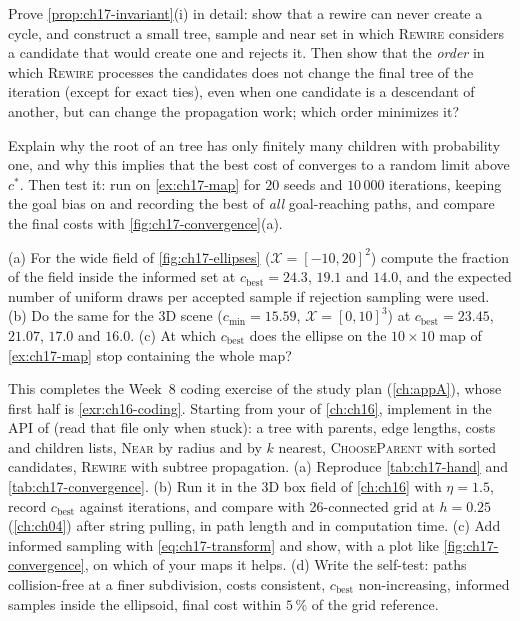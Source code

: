 \begin{exercise}[\difficulty{2}]
\label{exr:ch17-invariant}
Prove \cref{prop:ch17-invariant}(i) in detail: show that a rewire can never
create a cycle, and construct a small tree, sample and near set in which
\textsc{Rewire} considers a candidate that would create one and rejects it.
Then show that the \emph{order} in which \textsc{Rewire} processes the
candidates does not change the final tree of the iteration (except for
exact ties), even when one candidate is a descendant of another, but can
change the propagation work; which order minimizes it?
\end{exercise}

\begin{exercise}[\difficulty{2}]
\label{exr:ch17-rrt-limit}
Explain why the root of an \rrt tree has only finitely many children with
probability one, and why this implies that the best cost of \rrt converges
to a random limit above $c^*$. Then test it: run  on
\cref{ex:ch17-map} for $20$ seeds and $10\,000$ iterations, keeping the goal
bias on and recording the best of \emph{all} goal-reaching paths, and
compare the final costs with \cref{fig:ch17-convergence}(a).
\end{exercise}

\begin{exercise}[\difficulty{2}]
\label{exr:ch17-fraction}
(a) For the wide field of \cref{fig:ch17-ellipses}
($\mathcal{X}=[-10,20]^2$) compute the fraction of
the field inside the informed set at $c_{\mathrm{best}}=24.3$, $19.1$ and
$14.0$, and the expected number of uniform draws per accepted sample if
rejection sampling were used. (b) Do the same for the 3D scene
($c_{\min}=15.59$, $\mathcal{X}=[0,10]^3$) at $c_{\mathrm{best}}=23.45$,
$21.07$, $17.0$ and $16.0$. (c) At which $c_{\mathrm{best}}$ does the
ellipse on the $10\times10$ map of \cref{ex:ch17-map} stop containing the
whole map?
\end{exercise}

\begin{exercise}
\label{exr:ch17-coding}
This completes the Week~8 coding exercise of the study plan
(\cref{ch:appA}), whose first half is \cref{exr:ch16-coding}.
Starting from your \rrt of \cref{ch:ch16}, implement \rrtstar in the API
of  (read that file only when stuck): a tree
with parents, edge lengths, costs and children lists, \textsc{Near} by
radius and by $k$ nearest, \textsc{ChooseParent} with sorted candidates,
\textsc{Rewire} with subtree propagation. (a) Reproduce
\cref{tab:ch17-hand} and \cref{tab:ch17-convergence}. (b) Run it in the
3D box field of \cref{ch:ch16} with $\eta=1.5$, record $c_{\mathrm{best}}$
against iterations, and compare with 26-connected grid \astar at $h=0.25$
(\cref{ch:ch04}) after string pulling, in path length and in computation
time. (c) Add informed sampling with \cref{eq:ch17-transform} and show, with
a plot like \cref{fig:ch17-convergence}, on which of your maps it helps.
(d) Write the self-test: paths collision-free at a finer subdivision, costs
consistent, $c_{\mathrm{best}}$ non-increasing, informed samples inside the
ellipsoid, final cost within $5\,\%$ of the grid reference.
\end{exercise}

